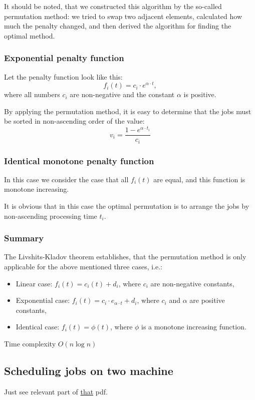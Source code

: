 \documentclass[8pt, a4paper, oneside, twocolumn]{extarticle}
\begin{document}
It should be noted, that we constructed this algorithm by the so-called permutation method: we tried to swap two adjacent elements, calculated how much the penalty changed, and then derived the algorithm for finding the optimal method.
\subsubsection{Exponential penalty function}

Let the penalty function look like this: $$f_i(t) = c_i \cdot e^{\alpha \cdot t},$$ where all numbers $c_i$ are non-negative and the constant $\alpha$ is positive.

By applying the permutation method, it is easy to determine that the jobs must be sorted in non-ascending order of the value: $$v_i = \frac{1 - e^{\alpha \cdot t_i}}{c_i}$$
\subsubsection{Identical monotone penalty function}

In this case we consider the case that all $f_i(t)$ are equal, and this function is monotone increasing.

It is obvious that in this case the optimal permutation is to arrange the jobs by non-ascending processing time $t_i$.
\subsubsection{Summary}
The Livshits-Kladov theorem establishes, that the permutation method is only applicable for the above mentioned three cases, i.e.:
\begin{itemize}
    \item Linear case: $f_i(t) = c_i(t) + d_i$, where $c_i$ are non-negative constants,
    \item Exponential case: $f_i(t) = c_i \cdot e_{\alpha \cdot t} + d_i$, where $c_i$ and $\alpha$ are positive constants,
    \item Identical case: $f_i(t) = \phi(t)$, where $\phi$ is a monotone increasing function.
\end{itemize}
Time complexity $O(n \log n)$
\subsection{Scheduling jobs on two machine}
Just see relevant part of \href{https://github.com/sourabhxyz/Competitive-Programming/blob/master/Reference%20Notes/Scheduling%20jobs%20on%20two%20machines/P402.pdf}{that} pdf.
\end{document}
